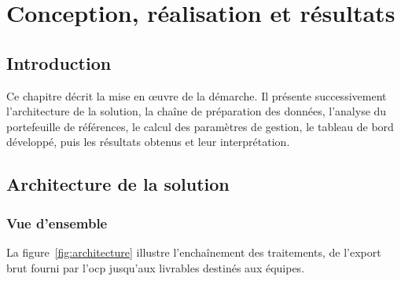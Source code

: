 \chapter{Conception, réalisation et résultats}
\label{chap:conception}

\section*{Introduction}

Ce chapitre décrit la mise en \oe uvre de la démarche. Il présente
successivement l'architecture de la solution, la chaîne de préparation des
données, l'analyse du portefeuille de références, le calcul des paramètres de
gestion, le tableau de bord développé, puis les résultats obtenus et leur
interprétation.

\section{Architecture de la solution}
\label{sec:architecture}

\subsection{Vue d'ensemble}

La figure~\ref{fig:architecture} illustre l'enchaînement des traitements, de
l'export brut fourni par l'\gls{ocp} jusqu'aux livrables destinés aux équipes.

